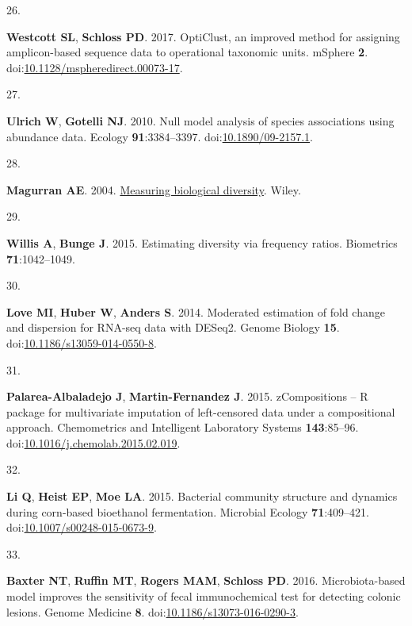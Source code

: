 \documentclass[
]{article}
\newlength{\cslhangindent}
\newlength{\csllabelwidth}
\newlength{\cslentryspacingunit} %
\newenvironment{CSLReferences}[2] %
 {%
  \setlength{\parindent}{0pt}
  \ifodd #1
  \let\oldpar\par
  \def\par{\hangindent=\cslhangindent\oldpar}
  \fi
  \setlength{\parskip}{#2\cslentryspacingunit}
 }%
 {}
\newcommand{\CSLLeftMargin}[1]{\parbox[t]{\csllabelwidth}{#1}}
\newcommand{\CSLRightInline}[1]{\parbox[t]{\linewidth - \csllabelwidth}{#1}\break}
\begin{document}
\begin{CSLReferences}{0}{1}
\leavevmode{}%
\CSLLeftMargin{26. }%
\CSLRightInline{\textbf{Westcott SL}, \textbf{Schloss PD}. 2017.
{OptiClust}, an improved method for assigning amplicon-based sequence
data to operational taxonomic units. {mSphere} \textbf{2}.
doi:\href{https://doi.org/10.1128/mspheredirect.00073-17}{10.1128/mspheredirect.00073-17}.}

\leavevmode{}%
\CSLLeftMargin{27. }%
\CSLRightInline{\textbf{Ulrich W}, \textbf{Gotelli NJ}. 2010. Null model
analysis of species associations using abundance data. Ecology
\textbf{91}:3384--3397.
doi:\href{https://doi.org/10.1890/09-2157.1}{10.1890/09-2157.1}.}

\leavevmode{}%
\CSLLeftMargin{28. }%
\CSLRightInline{\textbf{Magurran AE}. 2004.
\href{https://books.google.com/books?id=tUqzLSUzXxcC}{Measuring
biological diversity}. Wiley.}

\leavevmode{}%
\CSLLeftMargin{29. }%
\CSLRightInline{\textbf{Willis A}, \textbf{Bunge J}. 2015. Estimating
diversity via frequency ratios. Biometrics \textbf{71}:1042--1049.}

\leavevmode{}%
\CSLLeftMargin{30. }%
\CSLRightInline{\textbf{Love MI}, \textbf{Huber W}, \textbf{Anders S}.
2014. Moderated estimation of fold change and dispersion for {RNA}-seq
data with {DESeq}2. Genome Biology \textbf{15}.
doi:\href{https://doi.org/10.1186/s13059-014-0550-8}{10.1186/s13059-014-0550-8}.}

\leavevmode{}%
\CSLLeftMargin{31. }%
\CSLRightInline{\textbf{Palarea-Albaladejo J}, \textbf{Martin-Fernandez
J}. 2015. zCompositions -- {R} package for multivariate imputation of
left-censored data under a compositional approach. Chemometrics and
Intelligent Laboratory Systems \textbf{143}:85--96.
doi:\href{https://doi.org/10.1016/j.chemolab.2015.02.019}{10.1016/j.chemolab.2015.02.019}.}

\leavevmode{}%
\CSLLeftMargin{32. }%
\CSLRightInline{\textbf{Li Q}, \textbf{Heist EP}, \textbf{Moe LA}. 2015.
Bacterial community structure and dynamics during corn-based bioethanol
fermentation. Microbial Ecology \textbf{71}:409--421.
doi:\href{https://doi.org/10.1007/s00248-015-0673-9}{10.1007/s00248-015-0673-9}.}

\leavevmode{}%
\CSLLeftMargin{33. }%
\CSLRightInline{\textbf{Baxter NT}, \textbf{Ruffin MT}, \textbf{Rogers
MAM}, \textbf{Schloss PD}. 2016. Microbiota-based model improves the
sensitivity of fecal immunochemical test for detecting colonic lesions.
Genome Medicine \textbf{8}.
doi:\href{https://doi.org/10.1186/s13073-016-0290-3}{10.1186/s13073-016-0290-3}.}


\end{CSLReferences}
\end{document}
